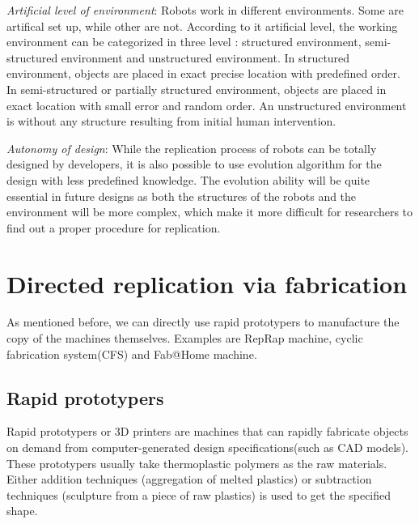 \documentclass[12pt,twoside]{article}
\theoremstyle{plain}
\theoremstyle{definition}
\theoremstyle{remark}
\newcommand{\TODO}[1]{\marginpar{\emph{\small{{\bf TODO: } #1}}}}
\newcommand{\etal}{\textit{et al.}}
\begin{document}
\emph{Artificial level of environment}: Robots work in different environments. Some are artifical set up, while other are not. According to it artificial level, the working environment can be categorized in three level\cite{lee_robotic_2007} : structured environment, semi-structured environment and unstructured environment. In structured environment, objects are placed in exact precise location with predefined order. In semi-structured or partially structured environment, objects are placed in exact location with small error and random order. An unstructured environment is without any structure resulting from initial human intervention.
  
\emph{Autonomy of design}: While the replication process of robots can be totally designed by developers, it is also possible to use evolution algorithm for the design with less predefined knowledge. The evolution ability will be quite essential in future designs as both the structures of the robots and the environment will be more complex, which make it more difficult for researchers to find out a proper procedure for replication.

% 

\section{Directed replication via fabrication}
\label{sec:fabri}

As mentioned before, we can directly use rapid prototypers to manufacture the copy of the machines themselves. Examples are RepRap machine\cite{jones_reprap_2011}, cyclic fabrication system(CFS)\cite{moses_towards_2009} and Fab@Home machine\cite{malone_fabhome:_2007}.

\subsection{Rapid prototypers}
Rapid prototypers or 3D printers are machines that can rapidly fabricate objects on demand from computer-generated design specifications(such as CAD models)\cite{lipson_homemade_2005}. These prototypers usually take thermoplastic polymers as the raw materials. Either addition techniques (aggregation of melted plastics) or subtraction techniques (sculpture from a piece of raw plastics) is used to get the specified shape.
\end{document}
